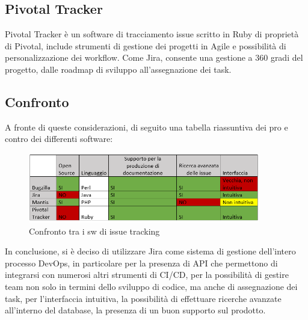 \documentclass[a4paper, 12pt]{report}
\numberwithin{equation}{section}
\begin{document}
\subsection{Pivotal Tracker}
Pivotal Tracker è un software di tracciamento issue scritto in Ruby di proprietà di Pivotal, include strumenti di gestione dei progetti in Agile e possibilità di personalizzazione dei workflow. Come Jira, consente una gestione a 360 gradi del progetto, dalle roadmap di sviluppo all’assegnazione dei task.
\subsection{Confronto}
A fronte di queste considerazioni, di seguito una tabella riassuntiva dei pro e contro dei differenti software:
\begin{figure}
    \centering
    \includegraphics[width=0.9\textwidth]{imgs/confronto-sw-issue.PNG}
    \caption{Confronto tra i sw di issue tracking}
    \label{fig:confronto}
\end{figure}
In conclusione, si è deciso di utilizzare Jira come sistema di gestione dell’intero processo DevOps, in particolare per la presenza di API che permettono di integrarsi con numerosi altri strumenti di CI/CD, per la possibilità di gestire team non solo in termini dello sviluppo di codice, ma anche di assegnazione dei task, per l’interfaccia intuitiva, la possibilità di effettuare ricerche avanzate all’interno del database, la presenza di un buon supporto sul prodotto.\\
\end{document}
